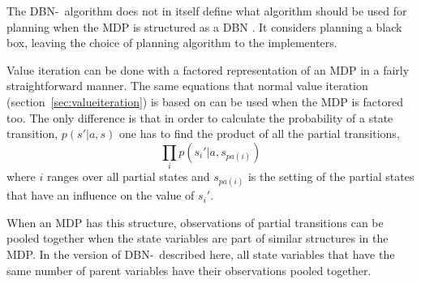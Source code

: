 The DBN-\etre\ algorithm does not in itself define what algorithm should be
used for planning when the MDP is structured as a DBN
\parencite{kearns1999efficient}. It considers planning a black box, leaving the
choice of planning algorithm to the implementers. 

Value iteration can be done with a factored representation of an MDP in a fairly straightforward manner. The same equations that normal value iteration (section~\ref{sec:valueiteration}) is based on can be used when the MDP is factored too. The only difference is that in order to calculate the probability of a state transition, $p(s'| a, s)$ one has to find the product of all the partial transitions,
\begin{equation}
\prod\limits _{i} p(s_i' | a, s_{pa(i)})
\end{equation}
where $i$ ranges over all partial states and $s_{pa(i)}$ is the setting of the partial states that have an influence on the value of $s_i'$. 

When an MDP has this structure, observations of partial transitions can be pooled together when the state variables are part of similar structures in the MDP. In the version of DBN-\etre\ described here, all state variables that have the same number of parent variables have their observations pooled together. 
